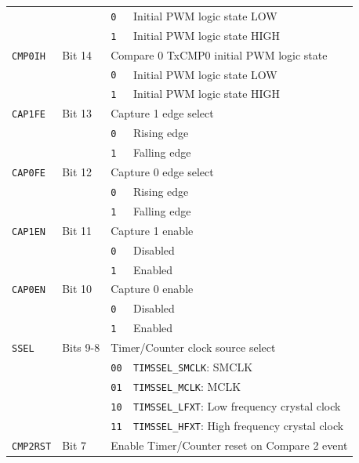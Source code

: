 \begin{tabularx}{\textwidth}{ l l l X }
 & & \texttt{0} & Initial PWM logic state LOW \\
 & & \cellcolor{tablehighlightcolor}\texttt{1} & \cellcolor{tablehighlightcolor}Initial PWM logic state HIGH \\
\hline
\texttt{CMP0IH} & Bit 14 & \multicolumn{2}{X}{Compare 0 TxCMP0 initial PWM logic state} \\
 & & \texttt{0} & Initial PWM logic state LOW \\
 & & \cellcolor{tablehighlightcolor}\texttt{1} & \cellcolor{tablehighlightcolor}Initial PWM logic state HIGH \\
\hline
\texttt{CAP1FE} & Bit 13 & \multicolumn{2}{X}{Capture 1 edge select} \\
 & & \texttt{0} & Rising edge \\
 & & \cellcolor{tablehighlightcolor}\texttt{1} & \cellcolor{tablehighlightcolor}Falling edge \\
\hline
\texttt{CAP0FE} & Bit 12 & \multicolumn{2}{X}{Capture 0 edge select} \\
 & & \texttt{0} & Rising edge \\
 & & \cellcolor{tablehighlightcolor}\texttt{1} & \cellcolor{tablehighlightcolor}Falling edge \\
\hline
\texttt{CAP1EN} & Bit 11 & \multicolumn{2}{X}{Capture 1 enable} \\
 & & \texttt{0} & Disabled \\
 & & \cellcolor{tablehighlightcolor}\texttt{1} & \cellcolor{tablehighlightcolor}Enabled \\
\hline
\texttt{CAP0EN} & Bit 10 & \multicolumn{2}{X}{Capture 0 enable} \\
 & & \texttt{0} & Disabled \\
 & & \cellcolor{tablehighlightcolor}\texttt{1} & \cellcolor{tablehighlightcolor}Enabled \\
\hline
\texttt{SSEL} & Bits 9-8 & \multicolumn{2}{X}{Timer/Counter clock source select} \\
 & & \texttt{00} & \texttt{TIMSSEL\_SMCLK}: SMCLK \\
 & & \cellcolor{tablehighlightcolor}\texttt{01} & \cellcolor{tablehighlightcolor}\texttt{TIMSSEL\_MCLK}: MCLK \\
 & & \texttt{10} & \texttt{TIMSSEL\_LFXT}: Low frequency crystal clock \\
 & & \cellcolor{tablehighlightcolor}\texttt{11} & \cellcolor{tablehighlightcolor}\texttt{TIMSSEL\_HFXT}: High frequency crystal clock \\
\hline
\texttt{CMP2RST} & Bit 7 & \multicolumn{2}{X}{Enable Timer/Counter reset on Compare 2 event} \\

\end{tabularx}

